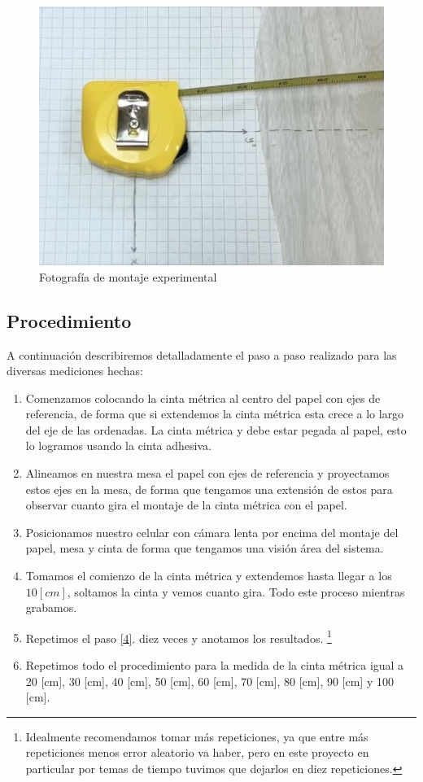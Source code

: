 \documentclass{article}
\begin{document}
    \begin{figure}[ht]
        \centering
        \includegraphics[scale=0.25]{Informe/img/montaje1.png}
        \caption{Fotografía de montaje experimental}
        \label{fig:montaje}
    \end{figure}
    
\subsection{Procedimiento}
A continuación describiremos detalladamente el paso a paso realizado para las diversas mediciones hechas:

\begin{enumerate}
    \item Comenzamos colocando la cinta métrica al centro del papel con ejes de referencia, de forma que si extendemos la cinta métrica esta crece a lo largo del eje de las ordenadas. La cinta métrica y debe estar pegada al papel, esto lo logramos usando la cinta adhesiva.
    \item Alineamos en nuestra mesa el papel con ejes de referencia y proyectamos estos ejes en la mesa, de forma que tengamos una extensión de estos para observar cuanto gira el montaje de la cinta métrica con el papel. 
    \item Posicionamos nuestro celular con cámara lenta por encima del montaje del papel, mesa y cinta de forma que tengamos una visión área del sistema.
    \item Tomamos el comienzo de la cinta métrica y extendemos hasta llegar a los $10 [cm]$, soltamos la cinta y vemos cuanto gira. Todo este proceso mientras grabamos. \label{4} 
    \item Repetimos el paso \ref{4}. diez veces y anotamos los resultados. \footnote{Idealmente recomendamos tomar más repeticiones, ya que entre más repeticiones menos error aleatorio va haber, pero en este proyecto en particular por temas de tiempo tuvimos que dejarlos en diez repeticiones.}
    \item Repetimos todo el procedimiento para la medida de la cinta métrica igual a 20 [cm], 30 [cm], 40 [cm], 50 [cm], 60 [cm], 70 [cm], 80 [cm], 90 [cm] y 100 [cm].
\end{enumerate}
\end{document}
